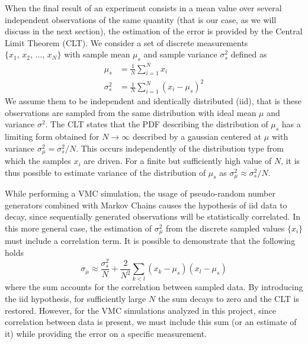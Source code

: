 When the final result of an experiment consists in a mean value over several independent observations of the same quantity (that is our case, as we will discuss in the next section), the estimation of the error is provided by the Central Limit Theorem (CLT). We consider a set of discrete measurements $\{x_1,\,x_2,\,\dots, \, x_N\}$ with sample mean $\mu_s$ and sample variance $\sigma_s^2$ defined as
\begin{align*}
    \mu_s &= \frac{1}{N} \sum_{i=1}^N x_i \\
    \sigma_s^2 &= \frac{1}{N} \sum_{i=1}^N (x_i - \mu_s)^2
\end{align*}
We assume them to be independent and identically distributed (iid), that is these observations are sampled from the same distribution with ideal mean $\mu$ and variance $\sigma^2$. The CLT states that the PDF describing the distribution of $\mu_s$ has a limiting form obtained for $N\rightarrow \infty$ described by a gaussian centered at $\mu$ with variance $\sigma_\mu^2 = \sigma_s^2/N$. This occurs independently of the distribution type from which the samples $x_i$ are driven. For a finite but sufficiently high value of $N$, it is thus possible to estimate variance of the distribution of $\mu_s$ as $\sigma_\mu^2 \approx \sigma_s^2/N$.

While performing a VMC simulation, the usage of pseudo-random number generators combined with Markov Chains causes the hypothesis of iid data to decay, since sequentially generated observations will be  statistically correlated. In this more general case, the estimation of $\sigma_\mu^2$ from the discrete sampled values $\{ x_i \}$ must include a correlation term. It is possible to demonstrate that the following holds
\begin{equation}
    \sigma_\mu \approx \frac{\sigma_s^2}{N} + \frac{2}{N^2} \sum_{k<l} (x_k - \mu_s) (x_l - \mu_s)  
    \label{err_covariance}
\end{equation}
where the sum accounts for the correlation between sampled data. By introducing the iid hypothesis, for sufficiently large $N$ the sum decays to zero and the CLT is restored. However, for the VMC simulations analyzed in this project, since correlation between data is present, we must include this sum (or an estimate of it) while providing the error on a specific measurement.



